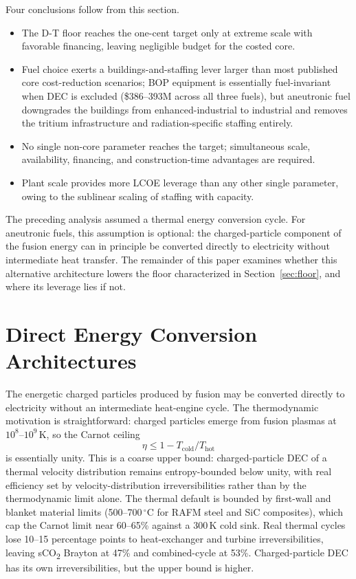 \documentclass{article}
\begin{document}
Four conclusions follow from this section.
\begin{itemize}
\item The D-T floor reaches the one-cent target only at extreme
scale with favorable financing, leaving negligible budget for the
costed core.
\item Fuel choice exerts a buildings-and-staffing lever larger than
most published core cost-reduction scenarios; BOP equipment is
essentially fuel-invariant when DEC is excluded (\$386--393M
across all three fuels), but aneutronic fuel downgrades the
buildings from enhanced-industrial to industrial and removes the
tritium infrastructure and radiation-specific staffing entirely.
\item No single non-core parameter reaches the target; simultaneous
scale, availability, financing, and construction-time advantages
are required.
\item Plant scale provides more LCOE leverage than any other single
parameter, owing to the sublinear scaling of staffing with capacity.
\end{itemize}

The preceding analysis assumed a thermal energy conversion cycle.
For aneutronic fuels, this assumption is optional: the
charged-particle component of the fusion energy can in principle be
converted directly to electricity without intermediate heat
transfer. The remainder of this paper examines whether this
alternative architecture lowers the floor characterized in
Section~\ref{sec:floor}, and where its leverage lies if not.

\section{Direct Energy Conversion Architectures}
\label{sec:dec}

The energetic charged particles produced by fusion may be converted
directly to electricity without an intermediate heat-engine cycle.
The thermodynamic motivation is straightforward: charged particles
emerge from fusion plasmas at $10^8$--$10^9$\,K, so the Carnot
ceiling
\[
  \eta \leq 1 - T_\mathrm{cold}/T_\mathrm{hot}
\]
is essentially unity. This is a coarse upper bound: charged-particle
DEC of a thermal velocity distribution remains entropy-bounded below
unity, with real efficiency set by velocity-distribution
irreversibilities rather than by the thermodynamic limit alone.
The thermal default is bounded by first-wall and blanket material
limits (500--700\,$^\circ$C for RAFM steel and SiC composites),
which cap the Carnot limit near 60--65\% against a 300\,K cold sink.
Real thermal cycles lose 10--15 percentage points to heat-exchanger
and turbine irreversibilities, leaving sCO\textsubscript{2} Brayton
at 47\% and combined-cycle at 53\%. Charged-particle DEC has its
own irreversibilities, but the upper bound is higher.
\end{document}
